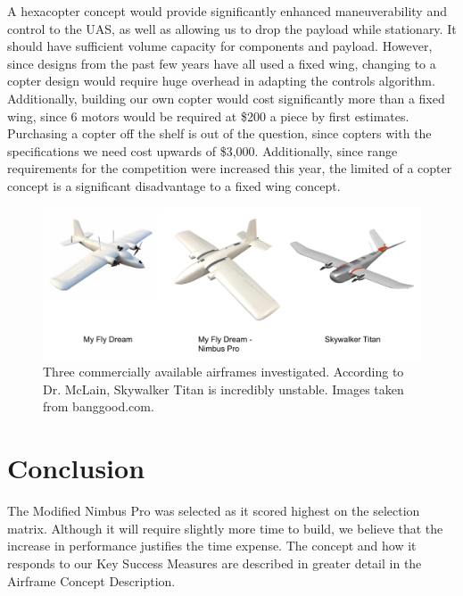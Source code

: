 \documentclass[]{auvsi_doc}
\begin{document}
A hexacopter concept would provide significantly enhanced maneuverability and control to the UAS, as well as allowing us to drop the payload while stationary. It should have sufficient volume capacity for components and payload. However, since designs from the past few years have all used a fixed wing, changing to a copter design would require huge overhead in adapting the controls algorithm. Additionally, building our own copter would cost significantly more than a fixed wing, since 6 motors would be required at \$200 a piece by first estimates. Purchasing a copter off the shelf is out of the question, since copters with the specifications we need cost upwards of \$3,000. Additionally, since range requirements for the competition were increased this year, the limited of a copter concept is a significant disadvantage to a fixed wing concept.

\begin{figure}[h!]
	\centering
	\includegraphics[scale=0.5]{Planes1}
	\caption{Three commercially available airframes investigated. According to Dr. McLain, Skywalker Titan is incredibly unstable. Images taken from banggood.com.}
	\label{planes1}	
\end{figure}

\section{Conclusion}

The Modified Nimbus Pro was selected as it scored highest on the selection matrix. Although it will require slightly more time to build, we believe that the increase in performance justifies the time expense. The concept and how it responds to our Key Success Measures are described in greater detail in the Airframe Concept Description.
\end{document}
